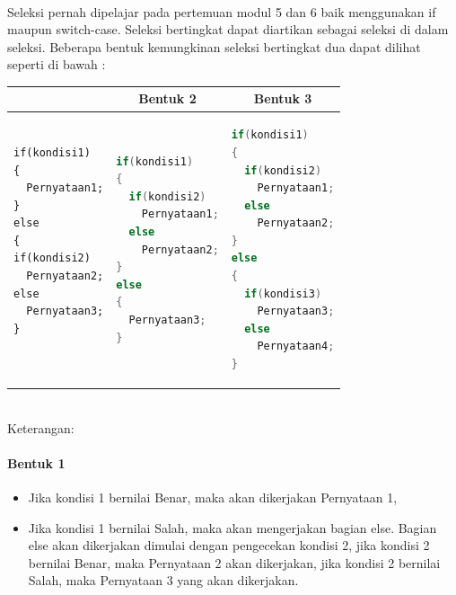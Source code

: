 \documentclass[a4paper,12pt]{article}
\begin{document}
\paragraph{}
Seleksi pernah dipelajar pada pertemuan modul 5 dan 6 baik menggunakan if maupun
switch-case. Seleksi bertingkat dapat diartikan sebagai seleksi di dalam seleksi. Beberapa bentuk kemungkinan seleksi bertingkat dua dapat dilihat seperti di bawah :
\begin{table}[!ht]
	\begin{tabular}{|l|l|l|}
		\hline
		\rowcolor[HTML]{E5B9B7}
		\multicolumn{1}{|c|}{\cellcolor[HTML]{E5B9B7} Bentuk 1} & \multicolumn{1}{c|}{\cellcolor[HTML]{E5B9B7} Bentuk 2} & \multicolumn{1}{c|}{\cellcolor[HTML]{E5B9B7} Bentuk 3} \\ \hline
		
		{\begin{lstlisting}
if(kondisi1)
{
  Pernyataan1;
}
else
{
if(kondisi2)
  Pernyataan2;
else
  Pernyataan3;
}
			
		\end{lstlisting}}&
{\begin{lstlisting}[language=Java]
if(kondisi1)
{
  if(kondisi2)
    Pernyataan1;
  else
    Pernyataan2;
}
else
{
  Pernyataan3;
}
	\end{lstlisting}}
	
	                               &
{\begin{lstlisting}[language=Java]
if(kondisi1)
{
  if(kondisi2)
    Pernyataan1;
  else
    Pernyataan2;
}
else
{
  if(kondisi3)
    Pernyataan3;
  else
    Pernyataan4;
}
\end{lstlisting}}
	                                                              \\ \hline
	\end{tabular}
\end{table}\\
Keterangan:
\paragraph{Bentuk 1}
\begin{itemize}
	\item Jika kondisi 1 bernilai Benar, maka akan dikerjakan Pernyataan 1,
	\item Jika kondisi 1 bernilai Salah, maka akan mengerjakan bagian else. Bagian else
	akan dikerjakan dimulai dengan pengecekan kondisi 2, jika kondisi 2 bernilai
	Benar, maka Pernyataan 2 akan dikerjakan, jika kondisi 2 bernilai Salah, maka
	Pernyataan 3 yang akan dikerjakan.
\end{itemize}
\end{document}
